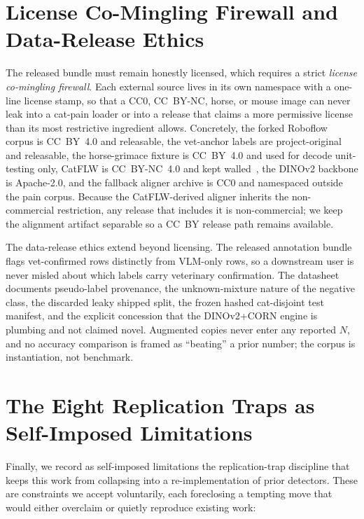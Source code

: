\section{License Co-Mingling Firewall and Data-Release Ethics}
\label{sec:license-firewall}

The released bundle must remain honestly licensed, which requires a strict
\emph{license co-mingling firewall}. Each external source lives in its own
namespace with a one-line license stamp, so that a CC0, CC~BY-NC, horse, or
mouse image can never leak into a cat-pain loader or into a release that claims a
more permissive license than its most restrictive ingredient allows. Concretely,
the forked Roboflow corpus is CC~BY~4.0 and releasable, the vet-anchor labels are
project-original and releasable, the horse-grimace fixture is CC~BY~4.0 and used
for decode unit-testing only, CatFLW is CC~BY-NC~4.0 and kept
walled~\cite{martvel2024catflw}, the DINOv2 backbone is Apache-2.0, and the
fallback aligner archive is CC0 and namespaced outside the pain corpus. Because
the CatFLW-derived aligner inherits the non-commercial restriction, any release
that includes it is non-commercial; we keep the alignment artifact separable so a
CC~BY release path remains available.

The data-release ethics extend beyond licensing. The released annotation bundle
flags vet-confirmed rows distinctly from VLM-only rows, so a downstream user is
never misled about which labels carry veterinary confirmation. The datasheet
documents pseudo-label provenance, the unknown-mixture nature of the negative
class, the discarded leaky shipped split, the frozen hashed cat-disjoint test
manifest, and the explicit concession that the DINOv2+CORN engine is plumbing and
not claimed novel. Augmented copies never enter any reported $N$, and no
accuracy comparison is framed as ``beating'' a prior number; the corpus is
instantiation, not benchmark.

\section{The Eight Replication Traps as Self-Imposed Limitations}
\label{sec:replication-traps}

Finally, we record as self-imposed limitations the replication-trap discipline
that keeps this work from collapsing into a re-implementation of prior detectors.
These are constraints we accept voluntarily, each foreclosing a tempting move
that would either overclaim or quietly reproduce existing work:


